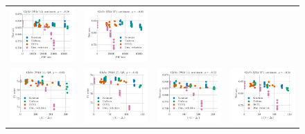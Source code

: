 \begin{figure}
\begin{tabular}{@{\hskip -0.0in}c@{\hskip -0.0in}c@{\hskip -0.0in}c@{\hskip -0.0in}c@{\hskip -0.0in}}
		\includegraphics[width=.245\linewidth]{figures/glove400k_sentiment_sst_test-acc_vs_gram-large-dim-frob-error_linx_stoc.pdf} &
		\includegraphics[width=.245\linewidth]{figures/glove-wiki400k-am_sentiment_sst_test-acc_vs_gram-large-dim-frob-error_linx_stoc.pdf} \\
		\includegraphics[width=.245\linewidth]{figures/glove400k_qa_best-f1_vs_gram-large-dim-delta1-2-trans_linx_stoc.pdf} &
		\includegraphics[width=.245\linewidth]{figures/glove-wiki400k-am_qa_best-f1_vs_gram-large-dim-delta1-2-trans_linx_stoc.pdf} &
		\includegraphics[width=.245\linewidth]{figures/glove400k_sentiment_sst_test-acc_vs_gram-large-dim-delta1-2-trans_linx_stoc.pdf} &
		\includegraphics[width=.245\linewidth]{figures/glove-wiki400k-am_sentiment_sst_test-acc_vs_gram-large-dim-delta1-2-trans_linx_stoc.pdf} \\

\end{tabular}
\end{figure}
